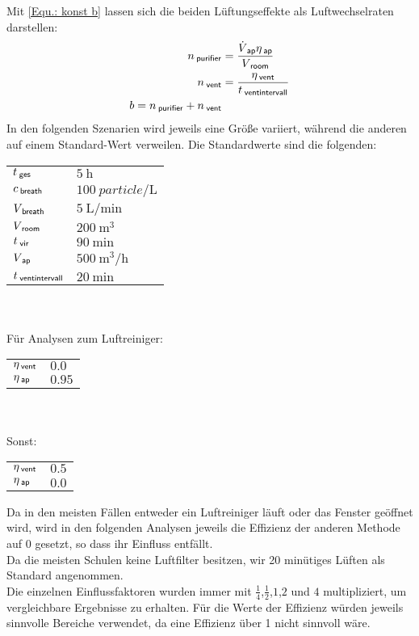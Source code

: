 \documentclass[12pt,a4paper,bibtotocnumbered,liststotocnumbered]{scrreprt}
\begin{document}
Mit \autoref{Equ.: konst b} lassen sich die beiden Lüftungseffekte als Luftwechselraten darstellen:
\begin{align}
n_{\: \mathsf{purifier}} &= \frac{\dot{V}_{\: \mathsf{ap}} \eta_{\: \mathsf{ap}}}{V_{\: \mathsf{room}}}\\
n_{\: \mathsf{vent}} &= \frac{ \eta_{\: \mathsf{vent}} }{t_{\: \mathsf{ventintervall}}}\\
b = n_{\: \mathsf{purifier}} + n_{\: \mathsf{vent}}
\end{align}
In den folgenden Szenarien wird jeweils eine Größe variiert, während die anderen auf einem Standard-Wert verweilen. Die Standardwerte sind die folgenden:\\
\begin{tabular}{ll}
$t_{\: \mathsf{ges}}$ & $\SI{5}{\hour}$   \\
$c_{\: \mathsf{breath}}$ & $\SI{100}{particle\per\liter}$ \\   
$V_{\: \mathsf{breath}}$ & $\SI{5}{\liter\per\minute}$   \\
$V_{\: \mathsf{room}}$ & $\SI{200}{\cubic\meter}$   \\
$t_{\: \mathsf{vir}}$ & $\SI{90}{\minute}$\\
$V_{\: \mathsf{ap}}$ & $\SI{500}{\cubic\meter\per\hour}$   \\
$t_{\: \mathsf{ventintervall}}$ & $\SI{20}{\minute}$    \\
\end{tabular}
\\ \\
Für Analysen zum Luftreiniger:\\
\begin{tabular}{ll}
$\eta_{\: \mathsf{vent}}$ & $0.0$ \\
$\eta_{\: \mathsf{ap}}$ & $0.95$    \\
\end{tabular}
\\ \\
Sonst:\\
\begin{tabular}{ll}
$\eta_{\: \mathsf{vent}}$ & $0.5$ \\
$\eta_{\: \mathsf{ap}}$ & $0.0$    \\
\end{tabular}

Da in den meisten Fällen entweder ein Luftreiniger läuft oder das Fenster geöffnet wird, wird in den folgenden Analysen jeweils die Effizienz der anderen Methode auf 0 gesetzt, so dass ihr Einfluss entfällt.\\
Da die meisten Schulen keine Luftfilter besitzen, wir 20 minütiges Lüften als Standard angenommen.\\
Die einzelnen Einflussfaktoren wurden immer mit $\frac{1}{4}$,$\frac{1}{2}$,$1$,$2$ und $4$ multipliziert, um vergleichbare Ergebnisse zu erhalten. Für die Werte der Effizienz würden jeweils sinnvolle Bereiche verwendet, da eine Effizienz über 1 nicht sinnvoll wäre.\\
\end{document}
